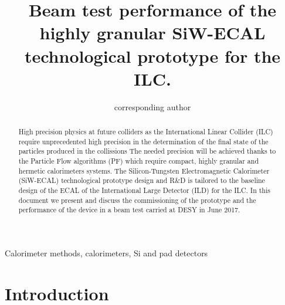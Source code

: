 \documentclass[final,3p,times,twocolumn]{elsarticle}
\begin{document}
\begin{frontmatter}
  \title{Beam test performance of the highly granular SiW-ECAL technological prototype for the ILC.}
  
\author{corresponding author}


\begin{keyword}
  Calorimeter methods, calorimeters, Si and pad detectors
\end{keyword}



\begin{abstract}
  High precision physics at future colliders as the International Linear Collider (ILC) require unprecedented high precision in the determination
  of the final state of the particles produced in the collissions
  The needed precision will be achieved thanks to the Particle Flow algorithms (PF) which require compact, highly granular and hermetic calorimeters systems.
  The Silicon-Tungsten Electromagnetic Calorimeter (SiW-ECAL) technological prototype
  design and R\&D is tailored to the baseline design of the ECAL of the International Large Detector (ILD) for the ILC.
  In this document we present and discuss the commissioning of the prototype
  and the performance of the device in a beam test carried at DESY in June 2017.
\end{abstract}

\end{frontmatter}

\linenumbers


\section{Introduction}
\end{document}
